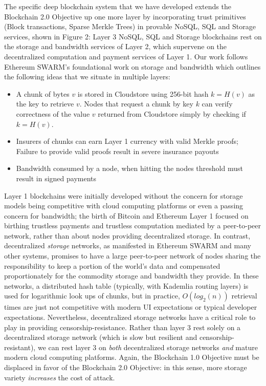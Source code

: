 \documentclass{article}
\newcommand{\hash}[1]{H(#1)}
\begin{document}
The specific deep blockchain system that we have developed extends the Blockchain 2.0 Objective up one more layer by incorporating trust primitives (Block transactions, Sparse Merkle Trees) in provable NoSQL, SQL and Storage services, shown in Figure 2:  Layer 3 NoSQL, SQL and Storage blockchains rest on the storage and bandwidth services of Layer 2, which supervene on the decentralized computation and payment services of Layer 1.  Our work follows Ethereum SWARM's foundational work on storage and bandwidth \cite{swarm} which outlines the following ideas that we situate in multiple layers:
\begin{itemize}
    \item A chunk of bytes $v$ is stored in Cloudstore using 256-bit hash $k = \hash{v}$ as the key to retrieve $v$.  Nodes that request a chunk by key $k$ can verify correctness of the value $v$ returned from Cloudstore simply by checking if   $k=\hash{v}$.
    \item Insurers of chunks can earn Layer 1 currency with valid Merkle proofs; Failure to provide valid proofs result in severe insurance payouts
    \item Bandwidth consumed by a node, when hitting the nodes threshold must result in signed payments
\end{itemize}
Layer 1 blockchains were initially developed without the concern for storage models being competitive with cloud computing platforms or even a passing concern for bandwidth; the birth of Bitcoin and Ethereum Layer 1 focused on birthing trustless payments and trustless computation mediated by a peer-to-peer network, rather than about nodes providing decentralized storage.   In contrast, decentralized {\em storage} networks, as manifested in Ethereum SWARM and many other systems, promises to have a large peer-to-peer network of nodes sharing the responsibility to keep a portion of the world's data and compensated proportionately for the commodity storage and bandwidth they provide.  In these networks, a distributed hash table (typically, with Kademlia routing layers) is used for logarithmic look ups of chunks, but in practice, $O(log_2(n))$ retrieval times are just not competitive with modern UI expectations or typical developer expectations.  Nevertheless, decentralized storage networks have a critical role to play in providing censorship-resistance.  Rather than layer 3 rest solely on a decentralized storage network (which is slow but resilient and censorship-resistant), we can rest layer 3 on {\em both} decentralized storage networks {\em and} mature modern cloud computing platforms.  Again, the Blockchain 1.0 Objective must be displaced in favor of the Blockchain 2.0 Objective: in this sense, more storage variety {\em increases} the cost of attack.
\end{document}
